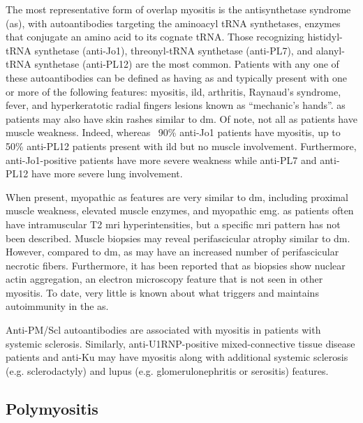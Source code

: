 The most representative form of overlap myositis is the antisynthetase syndrome (\gls{as}), with autoantibodies targeting the aminoacyl tRNA synthetases, enzymes that conjugate an amino acid to its cognate tRNA.\cite{PinalFernandez2017a,TralleroAraguas2016} Those recognizing histidyl-tRNA synthetase (anti-Jo1), threonyl-tRNA synthetase (anti-PL7), and alanyl-tRNA synthetase (anti-PL12) are the most common.\cite{PinalFernandez2017a,TralleroAraguas2016} Patients with any one of these autoantibodies can be defined as having \gls{as} and typically present with one or more of the following features: myositis, \gls{ild}, arthritis, Raynaud's syndrome, fever, and hyperkeratotic radial fingers lesions known as “mechanic’s hands”.\cite{SelvaOCallaghan2018} \gls{as} patients may also have skin rashes similar to \gls{dm}.\cite{SelvaOCallaghan2018} Of note, not all \gls{as} patients have muscle weakness. Indeed, whereas ~90\% anti-Jo1 patients have myositis, up to 50\% anti-PL12 patients present with \gls{ild} but no muscle involvement.\cite{PinalFernandez2017a} Furthermore, anti-Jo1-positive patients have more severe weakness while anti-PL7 and anti-PL12 have more severe lung involvement.\cite{PinalFernandez2017a,TralleroAraguas2016}

When present, myopathic \gls{as} features are very similar to \gls{dm}, including proximal muscle weakness, elevated muscle enzymes, and myopathic \gls{emg}.\cite{SelvaOCallaghan2018} \gls{as} patients often have intramuscular T2 \gls{mri} hyperintensities, but a specific \gls{mri} pattern has not been described.\cite{Andersson2017} Muscle biopsies may reveal perifascicular atrophy similar to \gls{dm}. However, compared to \gls{dm}, \gls{as} may have an increased number of perifascicular necrotic fibers.\cite{MescamMancini2015,Noguchi2017} Furthermore, it has been reported that \gls{as} biopsies show nuclear actin aggregation, an electron microscopy feature that is not seen in other myositis.\cite{Stenzel2015} To date, very little is known about what triggers and maintains autoimmunity in the \gls{as}.

Anti-PM/Scl autoantibodies are associated with myositis in patients with systemic sclerosis.\cite{GuillenDelCastillo2014} Similarly, anti-U1RNP-positive mixed-connective tissue disease patients and anti-Ku may have myositis along with additional systemic sclerosis (e.g. sclerodactyly) and lupus (e.g. glomerulonephritis or serositis) features.\cite{Rigolet2012,EscolaVerge2017}

\subsection{Polymyositis}

